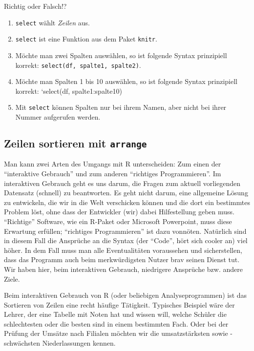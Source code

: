 \documentclass[12pt,ngerman,]{book}
\providecommand{\tightlist}{%
  \setlength{\itemsep}{0pt}\setlength{\parskip}{0pt}}
\theoremstyle{definition}
\theoremstyle{definition}
\theoremstyle{remark}
\let\BeginKnitrBlock\begin \let\EndKnitrBlock\end
\begin{document}
\BeginKnitrBlock{rmdexercises}
Richtig oder Falsch!?

\begin{enumerate}
\def\labelenumi{\arabic{enumi}.}
\tightlist
\item
  \texttt{select} wählt \emph{Zeilen} aus.
\item
  \texttt{select} ist eine Funktion aus dem Paket \texttt{knitr}.
\item
  Möchte man zwei Spalten auswählen, so ist folgende Syntax prinzipiell
  korrekt: \texttt{select(df,\ spalte1,\ spalte2)}.
\item
  Möchte man Spalten 1 bis 10 auswählen, so ist folgende Syntax
  prinzipiell korrekt: `select(df, spalte1:spalte10)
\item
  Mit \texttt{select} können Spalten nur bei ihrem Namen, aber nicht bei
  ihrer Nummer aufgerufen werden.
\end{enumerate}
\EndKnitrBlock{rmdexercises}

\subsection{\texorpdfstring{Zeilen sortieren mit
\texttt{arrange}}{Zeilen sortieren mit arrange}}\label{zeilen-sortieren-mit-arrange}

Man kann zwei Arten des Umgangs mit R unterscheiden: Zum einen der
``interaktive Gebrauch'' und zum anderen ``richtiges Programmieren''. Im
interaktiven Gebrauch geht es uns darum, die Fragen zum aktuell
vorliegenden Datensatz (schnell) zu beantworten. Es geht nicht darum,
eine allgemeine Lösung zu entwickeln, die wir in die Welt verschicken
können und die dort ein bestimmtes Problem löst, ohne dass der
Entwickler (wir) dabei Hilfestellung geben muss. ``Richtige'' Software,
wie ein R-Paket oder Microsoft Powerpoint, muss diese Erwartung
erfüllen; ``richtiges Programmieren'' ist dazu vonnöten. Natürlich sind
in diesem Fall die Ansprüche an die Syntax (der ``Code'', hört sich
cooler an) viel höher. In dem Fall muss man alle Eventualitäten
voraussehen und sicherstellen, dass das Programm auch beim
merkwürdigsten Nutzer brav seinen Dienst tut. Wir haben hier, beim
interaktiven Gebrauch, niedrigere Ansprüche bzw. andere Ziele.

Beim interaktiven Gebrauch von R (oder beliebigen Analyseprogrammen) ist
das Sortieren von Zeilen eine recht häufige Tätigkeit. Typisches
Beispiel wäre der Lehrer, der eine Tabelle mit Noten hat und wissen
will, welche Schüler die schlechtesten oder die besten sind in einem
bestimmten Fach. Oder bei der Prüfung der Umsätze nach Filialen möchten
wir die umsatzstärksten sowie -schwächsten Niederlassungen kennen.
\end{document}
